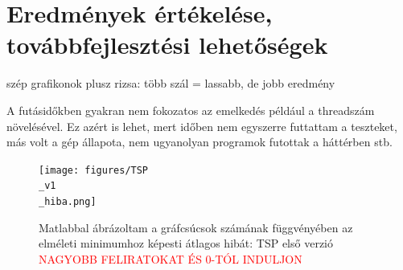 \section{Eredmények értékelése, továbbfejlesztési lehetőségek}

szép grafikonok plusz rizsa: több szál = lassabb, de jobb eredmény

A futásidőkben gyakran nem fokozatos az emelkedés például a threadszám növelésével. Ez azért is lehet, mert időben nem egyszerre futtattam a teszteket, más volt a gép állapota, nem ugyanolyan programok futottak a háttérben stb.

\begin{figure}[htbp!]
	\centering
	\texttt{[image: figures/TSP\\\_v1\\\_hiba.png]}
	\caption{Matlabbal ábrázoltam a gráfcsúcsok számának függvényében az elméleti minimumhoz képesti átlagos hibát: TSP első verzió \textcolor{red}{NAGYOBB FELIRATOKAT ÉS 0-TÓL INDULJON} }
	\label{fig:TSP_v1_hiba}
\end{figure}

